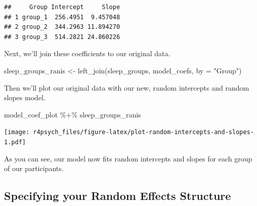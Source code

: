 \documentclass[
]{book}
\newenvironment{Shaded}{\begin{snugshade}}{\end{snugshade}}
\newcommand{\AttributeTok}[1]{\textcolor[rgb]{0.77,0.63,0.00}{#1}}
\newcommand{\CommentTok}[1]{\textcolor[rgb]{0.56,0.35,0.01}{\textit{#1}}}
\newcommand{\FunctionTok}[1]{\textcolor[rgb]{0.00,0.00,0.00}{#1}}
\newcommand{\NormalTok}[1]{#1}
\newcommand{\OtherTok}[1]{\textcolor[rgb]{0.56,0.35,0.01}{#1}}
\newcommand{\SpecialCharTok}[1]{\textcolor[rgb]{0.00,0.00,0.00}{#1}}
\newcommand{\StringTok}[1]{\textcolor[rgb]{0.31,0.60,0.02}{#1}}
\begin{document}
\begin{Shaded}
\end{Shaded}

\begin{verbatim}
##     Group Intercept     Slope
## 1 group_1  256.4951  9.457048
## 2 group_2  344.2963 11.894270
## 3 group_3  514.2821 24.860226
\end{verbatim}

Next, we'll join these coefficients to our original data.

\begin{Shaded}
\begin{Highlighting}[]
\NormalTok{sleep\_groups\_ranis }\OtherTok{\textless{}{-}} \FunctionTok{left\_join}\NormalTok{(sleep\_groups, model\_coefs, }\AttributeTok{by =} \StringTok{"Group"}\NormalTok{)}
\end{Highlighting}
\end{Shaded}

Then we'll plot our original data with our new, random intercepts and random slopes model.

\begin{Shaded}
\begin{Highlighting}[]
\NormalTok{model\_coef\_plot }\SpecialCharTok{\%+\%}\NormalTok{ sleep\_groups\_ranis}
\end{Highlighting}
\end{Shaded}

\texttt{[image: r4psych\_files/figure-latex/plot-random-intercepts-and-slopes-1.pdf]}

As you can see, our model now fits random intercepts and slopes for each group of our participants.

\hypertarget{specifying-your-random-effects-structure}{%
\subsection{Specifying your Random Effects Structure}\label{specifying-your-random-effects-structure}}
\end{document}
